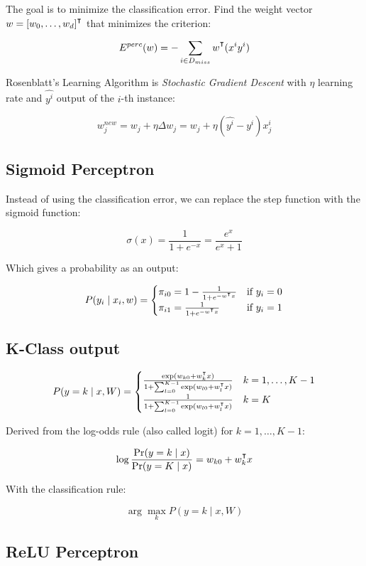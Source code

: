 \documentclass{idc_msc}
\renewcommand{\T}{{\mathpalette\raiseT\intercal}} %
\begin{document}
The goal is to minimize the classification error. Find the weight vector \(w = [w_0,\ldots,w_d]^\T\) that minimizes the criterion:

\[E^{perc}(w) = - \sum_{i \in D_{miss}} w^\T (x^i y^i)\]

Rosenblatt's Learning Algorithm is \emph{Stochastic Gradient Descent} with \(\eta\) learning rate and \(\hat{y^i}\) output of the \(i\)-th instance:

\[w_j^{new} = w_j + \eta \Delta w_j = w_j + \eta(\hat{y^i} - y^i) x_j^i \]

\subsection{Sigmoid Perceptron}

Instead of using the classification error, we can replace the step function with the sigmoid function:

\[\sigma(x) = \frac{1}{1 + e^{-x}} = \frac{e^x}{e^x + 1}\]

Which gives a probability as an output:

\[
P(y_i \mid x_i, w) =
\begin{cases}
\pi_{i0} = 1-\frac{1}{1+e^{-w^\T x}} & \text{if } y_i = 0 \\
\pi_{i1} = \frac{1}{1+e^{-w^\T x}} & \text{if } y_i = 1
\end{cases}
\]

\subsection{K-Class output}

\[
P(y = k \mid x, W) =
\begin{cases}
\frac{\exp(w_{k0} + w_k^\T x)}{1 + \sum_{l=0}^{K-1} \exp(w_{l0}+w_l^\T x)} & k = 1,\ldots,K-1 \\
\frac{1}{1 + \sum_{l=0}^{K-1} \exp(w_{l0}+w_l^\T x)} & k = K \\
\end{cases}
\]

Derived from the log-odds rule (also called logit) for \(k = 1,\ldots,K-1\):

\[
\log \frac{\Pr(y = k \mid x)}{\Pr(y = K \mid x)} = w_{k0} + w_k^\T x
\]

With the classification rule:

\[\arg\max_k P(y = k \mid x, W) \]

\subsection{ReLU Perceptron}
\end{document}
